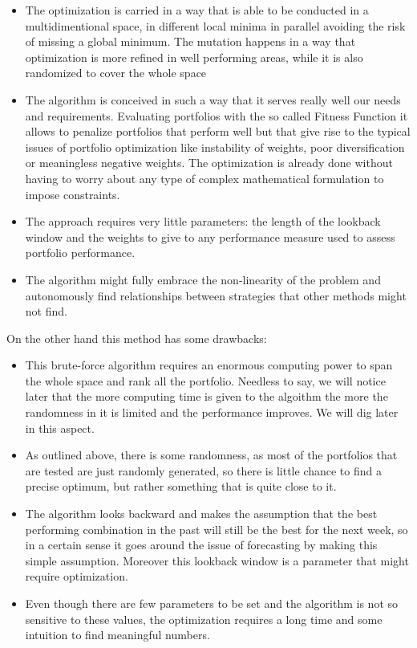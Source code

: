 \begin{itemize}
	\item The optimization is carried in a way that is able to be conducted in a multidimentional space, in different local minima in parallel avoiding the risk of missing a global minimum. The mutation happens in a way that optimization is more refined in well performing areas, while it is also randomized to cover the whole space
	\item The algorithm is conceived in such a way that it serves really well our needs and requirements. Evaluating portfolios with the so called Fitness Function it allows to penalize portfolios that perform well but that give rise to the typical issues of portfolio optimization like instability of weights, poor diversification or meaningless negative weights. The optimization is already done without having to worry about any type of complex mathematical formulation to impose constraints.
	\item The approach requires very little parameters: the length of the lookback window and the weights to give to any performance measure used to assess portfolio performance.
	\item The algorithm might fully embrace the non-linearity of the problem and autonomously find relationships between strategies that other methods might not find. 
\end{itemize}  

On the other hand this method has some drawbacks:

\begin{itemize}
	\item This brute-force algorithm requires an enormous computing power to span the whole space and rank all the portfolio. Needless to say, we will notice later that the more computing time is given to the algoithm the more the randomness in it is limited and the performance improves. We will dig later in this aspect. 
	\item As outlined above, there is some randomness, as most of the portfolios that are tested are just randomly generated, so there is little chance to find a precise optimum, but rather something that is quite close to it.
	\item The algorithm looks backward and makes the assumption that the best performing combination in the past will still be the best for the next week, so in a certain sense it goes around the issue of forecasting by making this simple assumption. Moreover this lookback window is a parameter that might require optimization.
	\item Even though there are few parameters to be set and the algorithm is not so sensitive to these values, the optimization requires a long time and some intuition to find meaningful numbers.
\end{itemize}